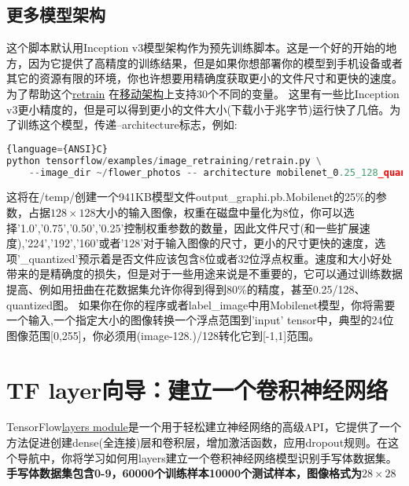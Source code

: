 \subsection{更多模型架构}\label{subsec:Other Model Architechtures}
这个脚本默认用Inception v3模型架构作为预先训练脚本。这是一个好的开始的地方，因为它提供了高精度的训练结果，但是如果你想部署你的模型到手机设备或者其它的资源有限的环境，你也许想要用精确度获取更小的文件尺寸和更快的速度。
为了帮助这个\href{https://github.com/tensorflow/tensorflow/blob/master/tensorflow/examples/image_retraining/retrain.py}{retrain}
在\href{https://research.googleblog.com/2017/06/mobilenets-open-source-models-for.html}{移动架构}上支持30个不同的变量。
这里有一些比Inception v3更小精度的，但是可以得到更小的文件大小(下载小于兆字节)运行快了几倍。为了训练这个模型，传递--architecture标志，例如:
\begin{lstlisting}[language=Python]{language={ANSI}C}
python tensorflow/examples/image_retraining/retrain.py \
    --image_dir ~/flower_photos -- architecture mobilenet_0.25_128_quantized
\end{lstlisting}
这将在/temp/创建一个941KB模型文件output\_graphi.pb.Mobilenet的25\%的参数，占据$128\times128$大小的输入图像，权重在磁盘中量化为8位，你可以选择'1.0','0.75','0.50','0.25'控制权重参数的数量，因此文件尺寸(和一些扩展速度),'224','192','160'或者'128'对于输入图像的尺寸，更小的尺寸更快的速度，选项'\_quantized'预示着是否文件应该包含8位或者32位浮点权重。速度和大小好处带来的是精确度的损失，但是对于一些用途来说是不重要的，它可以通过训练数据提高、例如用扭曲在花数据集允许你得到得到80\%的精度，甚至0.25/128、quantized图。
如果你在你的程序或者label\_image中用Mobilenet模型，你将需要一个输入,一个指定大小的图像转换一个浮点范围到'input' tensor中，典型的24位图像范围[0,255]，你必须用(image-128.)/128转化它到[-1,1]范围。

\section{TF layer向导：建立一个卷积神经网络}
TensorFlow\href{https://www.tensorflow.org/api_docs/python/tf/layers}{layers module}是一个用于轻松建立神经网络的高级API，它提供了一个方法促进创建dense(全连接)层和卷积层，增加激活函数，应用dropout规则。在这个导航中，你将学习如何用layers建立一个卷积神经网络模型识别手写体数据集。
\textbf{手写体数据集包含0-9，60000个训练样本10000个测试样本，图像格式为}$28\times28$
